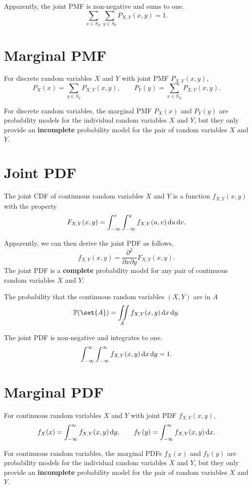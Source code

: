 Apparently, the joint PMF is non-negative and sums to one.
\[\sum_{x\in S_X}\sum_{y\in S_Y}P_{X,Y}(x,y)=1.\]

\section{Marginal PMF}
\begin{theorem}
    For discrete random variables $X$ and $Y$ with joint PMF $P_{X,Y}(x,y)$,
    \[P_X(x)=\sum_{y\in S_Y}P_{X,Y}(x,y), \qquad P_Y(y)=\sum_{x\in S_X}P_{X,Y}(x,y).\]
\end{theorem}
For discrete random variables, the marginal PMF $P_X(x)$ and $P_Y(y)$ are probability models for the individual random variables $X$ and $Y$, but they only provide an \textbf{incomplete} probability model for the pair of random variables $X$ and $Y$.

\section{Joint PDF}
\begin{definition}
    The joint CDF of continuous random variables $X$ and $Y$ is a function $f_{X,Y}(x,y)$ with the property
    \[F_{X,Y}(x,y)=\int_{-\infty}^{x}\int_{-\infty}^{y}f_{X,Y}(u,v)\mathop{}\!\mathrm{d} u \mathop{}\!\mathrm{d} v.\]
\end{definition}

Apparently, we can then derive the joint PDF as follows,
\[f_{X,Y}(x,y)=\frac{\partial^2}{\partial x \partial y}F_{X,Y}(x,y).\]
The joint PDF is a \textbf{complete} probability model for any pair of continuous random variables $X$ and $Y$.

\begin{theorem}
    The probability that the continuous random variables $(X,Y)$ are in $A$
    \[\P{\set{A}}=\iint\limits_A f_{X,Y}(x,y)\diff x\diff y.\]
\end{theorem}

The joint PDF is non-negative and integrates to one.
\[\int_{-\infty}^{\infty}\int_{-\infty}^{\infty}f_{X,Y}(x,y)\mathop{}\!\mathrm{d} x\mathop{}\!\mathrm{d} y=1.\]

\section{Marginal PDF}
\begin{theorem}
    For continuous random variables $X$ and $Y$ with joint PDF $f_{X,Y}(x,y)$,
    \[f_X(x)=\int_{-\infty}^{\infty}f_{X,Y}(x,y)\mathop{}\!\mathrm{d} y, \qquad f_Y(y)=\int_{-\infty}^{\infty}f_{X,Y}(x,y)\mathop{}\!\mathrm{d} x.\]
\end{theorem}
For continuous random variables, the marginal PDFs $f_X(x)$ and $f_Y(y)$ are probability models for the individual random variables $X$ and $Y$, but they only provide an \textbf{incomplete} probability model for the pair of random variables $X$ and $Y$.

